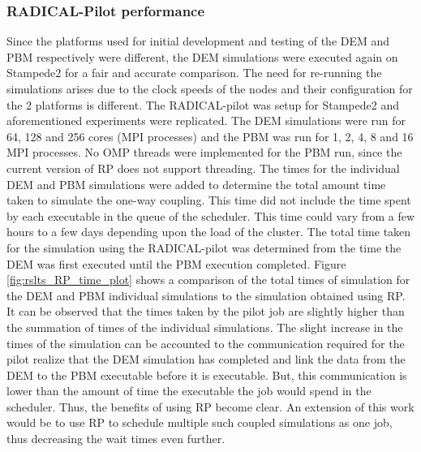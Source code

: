 \documentclass[preprint,11pt,authoryear]{elsarticle}
\begin{document}
\subsubsection{RADICAL-Pilot performance}
 Since the platforms used for initial development and testing of the DEM and PBM respectively were different, 
the DEM simulations were executed again on Stampede2 for a fair and accurate comparison. The need for re-running
the simulations arises due to the clock speeds of the nodes and their configuration for the 2 platforms is different.
The RADICAL-pilot was setup for Stampede2 and aforementioned experiments were replicated. The DEM simulations were 
run for 64, 128 and 256 cores (MPI processes) and the PBM was run for 1, 2, 4, 8 and 16 MPI processes. No OMP threads 
were implemented for the PBM run, since the current version of RP does not support threading. 
 The times for the individual DEM and PBM simulations were added to determine the total amount time taken to 
simulate the one-way coupling. This time did not include the time spent by each executable in the queue of the 
scheduler. This time could vary from a few hours to a few days depending upon the load of the cluster. The total 
time taken for the simulation using the RADICAL-pilot was determined from the time the DEM was first executed until 
the PBM execution completed. Figure \ref{fig:rslts_RP_time_plot} shows a comparison of the total times of simulation 
for the DEM and PBM individual simulations to the simulation obtained using RP. It can be observed that the times taken 
by the pilot job are slightly higher than the summation of times of the individual simulations. The slight increase in 
the times of the simulation can be accounted to the communication required for the pilot realize that the DEM simulation 
has completed and link the data from the DEM to the PBM executable before it is executable. But, this communication is 
lower than the amount of time the executable the job would spend in the scheduler. Thus, the benefits of using RP become 
clear. An extension of this work would be to use RP to schedule multiple such coupled simulations as one job, thus 
decreasing the wait times even further. 
\end{document}
